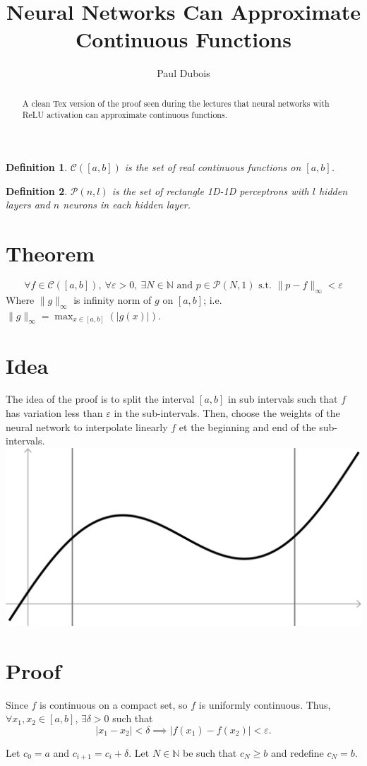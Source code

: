 \documentclass[]{article}
\title{Neural Networks Can Approximate Continuous Functions}
\author{Paul Dubois}
\date{}
\newtheorem{definition}{Definition}
\begin{document}
\maketitle

\begin{abstract}
	A clean Tex version of the proof seen during the lectures that neural networks with ReLU activation can approximate continuous functions.
\end{abstract}

\begin{definition}
	$\mathcal{C}\left( \left[ a,b \right] \right)$ is the set of real continuous functions on $\left[ a,b \right]$.
\end{definition}
\begin{definition}
	$\mathcal{P}\left( n,l \right)$ is the set of rectangle 1D-1D perceptrons with $l$ hidden layers and $n$ neurons in each hidden layer.
\end{definition}

\section{Theorem}
$$\forall f \in \mathcal{C}(\left[ a,b \right]), \ \forall \varepsilon > 0, \ \exists N \in \mathbb{N} \text{ and } p \in \mathcal{P}(N,1) \text{ s.t. } \|p-f\|_\infty < \varepsilon$$
Where $\|g\|_\infty$ is infinity norm of $g$ on $\left[ a,b \right]$; i.e. $\|g\|_\infty = \max_{x \in \left[ a,b \right]}(|g(x)|)$.

\section{Idea}
The idea of the proof is to split the interval $\left[ a,b \right]$ in sub intervals such that $f$ has variation less than $\varepsilon$ in the sub-intervals.
Then, choose the weights of the neural network to interpolate linearly $f$ et the beginning and end of the sub-intervals.
\includegraphics[width=\linewidth]{plot}

\section{Proof}
Since $f$ is continuous on a compact set, so $f$ is uniformly continuous.
Thus, $\forall x_1,x_2 \in \left[ a,b \right]$, $\exists \delta>0$ such that 
$$|x_1-x_2| < \delta \implies |f(x_1) - f(x_2)| < \varepsilon.$$

Let $c_0 = a$ and $c_{i+1} = c_i + \delta$. Let $N \in \mathbb{N}$ be such that $c_N \geq b$ and redefine $c_N = b$.
\end{document}
